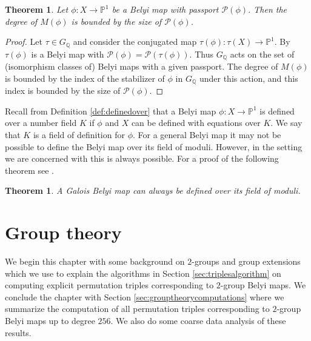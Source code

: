 \documentclass{dcthesis}
\newcommand{\PP}{\mathbb P}
\newcommand{\QQ}{\mathbb Q}
\newcommand{\defi}[1]{\textsf{#1}}
\numberwithin{equation}{section}
\newtheorem{theorem}[equation]{Theorem}
\theoremstyle{definition}
\theoremstyle{remark}
\begin{document}
{{{    %
    \begin{theorem}\label{thm:fieldofmoduli}
      Let $\phi:X\to\PP^1$ be a Belyi map
      with passport $\mathcal{P}(\phi)$.
      Then the degree
      of $M(\phi)$
      is bounded by the size of
      $\mathcal{P}(\phi)$.
    \end{theorem}
    \begin{proof}
      Let $\tau\in G_\QQ$ and consider the
      conjugated map
      $\tau(\phi)\colon \tau(X)\to\PP^1$.
      By \cite[Appendix]{jones_streit_manfred}
      $\tau(\phi)$ is a Belyi map with
      $\mathcal{P}(\phi) =
      \mathcal{P}(\tau(\phi))$.
      Thus $G_\QQ$ acts on the set
      of (isomorphism classes of) Belyi maps with
      a given passport.
      The degree of $M(\phi)$
      is bounded by the index of the
      stabilizer of $\phi$ in $G_\QQ$
      under this action,
      and this index is bounded by
      the size of $\mathcal{P}(\phi)$.
    \end{proof}
    Recall from Definition \ref{def:definedover}
    that a Belyi map
    $\phi\colon X\to\PP^1$
    is defined over a number field $K$
    if $\phi$ and $X$ can be defined with
    equations over $K$.
    We say that $K$
    is a \defi{field of definition}
    for $\phi$.
    For a general Belyi map it may not be possible
    to define the Belyi map over its field
    of moduli.
    However,
    in the setting we are concerned with
    this is always possible.
    For a proof of the following theorem see
    \cite[Proposition 2.5]{coombes_harbater}.
    \begin{theorem}
      \label{thm:galoisbelyimapoverfieldofmoduli}
      A Galois Belyi map can always be defined over
      its field of moduli.
    \end{theorem}
  }
}
\chapter{Group theory}{\label{chapter:grouptheory}
  We begin this chapter with some background
  on $2$-groups and group extensions which we
  use to explain the algorithms
  in Section \ref{sec:triplesalgorithm}
  on computing explicit permutation
  triples corresponding to $2$-group Belyi maps.
  We conclude the chapter with 
  Section \ref{sec:grouptheorycomputations}
  where we summarize the computation
  of all permutation triples corresponding
  to $2$-group Belyi maps up to degree $256$.
  We also do some coarse data analysis of these
  results.
}}
\end{document}
